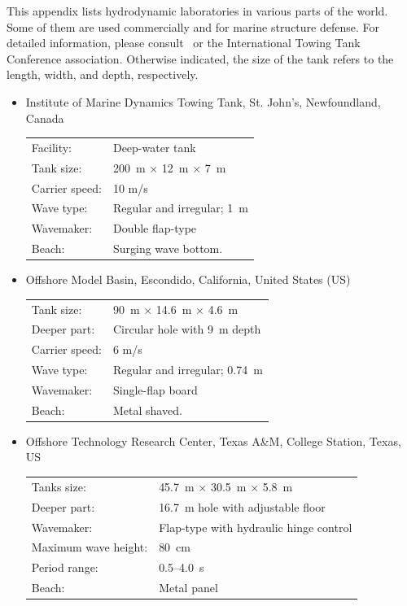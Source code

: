 \documentclass[12pt,a4paper]{report}
\begin{document}
This appendix lists hydrodynamic laboratories in various parts of the world. Some of them are used commercially and for marine structure defense. For detailed information, please consult~\cite{csk} or the International Towing Tank Conference association. Otherwise indicated, the size of the tank refers to the length, width, and depth, respectively.
\vfill
\begin{itemize}[leftmargin=1.5em]
\item[\textbf{a.}] Institute of Marine Dynamics Towing Tank, St. John's, Newfoundland, Canada \\
\begin{tabular}{@{}ll}
Facility: & Deep-water tank \\
Tank size:& 200~m $\times$ 12~m $\times$ 7~m \\
Carrier speed:& 10 m/s \\
Wave type:& Regular and irregular; 1~m \\
Wavemaker:& Double flap-type \\
Beach:& Surging wave bottom.
\end{tabular}
\vfill

\item[\textbf{b.}] Offshore Model Basin, Escondido, California, United States (US) \\
\begin{tabular}{@{}ll}
Tank size:& 90~m $\times$ 14.6~m $\times$ 4.6~m \\
Deeper part:& Circular hole with 9~m depth \\
Carrier speed:& 6 m/s \\
Wave type:& Regular and irregular; 0.74~m \\
Wavemaker:& Single-flap board \\
Beach:& Metal shaved.
\end{tabular}
\vfill

\item[\textbf{c.}] Offshore Technology Research Center, Texas A\&M, College Station, Texas, US \\
\begin{tabular}{@{}ll}
Tanks size:& 45.7~m $\times$ 30.5~m $\times$ 5.8~m \\
Deeper part:& 16.7~m hole with adjustable floor \\
Wavemaker:& Flap-type with hydraulic hinge control \\
Maximum wave height:& 80~cm \\
Period range:& 0.5--4.0~s \\
Beach:& Metal panel
\end{tabular}


\end{itemize}
\end{document}

